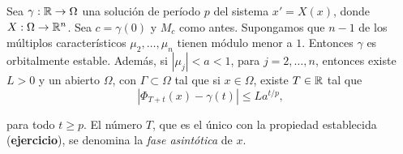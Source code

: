 \begin{teorema}{}
 Sea $\gamma:\mathbb{R}\to\Omega$ una solución de período $p$ del sistema $x'=X(x)$, donde $X:\Omega\to \mathbb{R}^n$. Sea $c=\gamma(0)$ y $M_c$ como antes. Supongamos que $n-1$ de los múltiplos 
 característicos $\mu_2,\ldots,\mu_n$ tienen módulo menor a $1$. Entonces $\gamma$ es orbitalmente estable. Además, si $|\mu_j|<a<1$, para $j=2,\ldots,n$, entonces 
 existe $L>0$ y un abierto $\Omega$, con $\Gamma\subset\Omega$ tal que si $x\in\Omega$, existe $T\in\mathbb{R}$ tal que
 \begin{equation}\label{est_asi}
  |\Phi_{T+t}(x)-\gamma(t)|\leq La^{t/p},
 \end{equation}

 para todo $t\geq p$. El número $T$, que es  el único con la propiedad establecida (\textbf{ejercicio}), se denomina la \emph{fase asintótica} de $x$.
 
\end{teorema}



